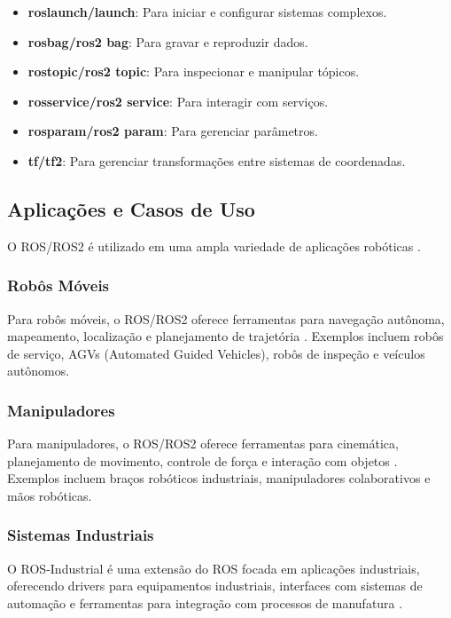 \begin{itemize}
    \item \textbf{roslaunch/launch}: Para iniciar e configurar sistemas complexos.
    \item \textbf{rosbag/ros2 bag}: Para gravar e reproduzir dados.
    \item \textbf{rostopic/ros2 topic}: Para inspecionar e manipular tópicos.
    \item \textbf{rosservice/ros2 service}: Para interagir com serviços.
    \item \textbf{rosparam/ros2 param}: Para gerenciar parâmetros.
    \item \textbf{tf/tf2}: Para gerenciar transformações entre sistemas de coordenadas.
\end{itemize}

\subsection{Aplicações e Casos de Uso}

O ROS/ROS2 é utilizado em uma ampla variedade de aplicações robóticas \cite{Joseph2018, Macenski2022}.

\subsubsection{Robôs Móveis}

Para robôs móveis, o ROS/ROS2 oferece ferramentas para navegação autônoma, mapeamento, localização e planejamento de trajetória \cite{Joseph2018, Macenski2022}. Exemplos incluem robôs de serviço, AGVs (Automated Guided Vehicles), robôs de inspeção e veículos autônomos.

\subsubsection{Manipuladores}

Para manipuladores, o ROS/ROS2 oferece ferramentas para cinemática, planejamento de movimento, controle de força e interação com objetos \cite{Joseph2018, Macenski2022}. Exemplos incluem braços robóticos industriais, manipuladores colaborativos e mãos robóticas.

\subsubsection{Sistemas Industriais}

O ROS-Industrial é uma extensão do ROS focada em aplicações industriais, oferecendo drivers para equipamentos industriais, interfaces com sistemas de automação e ferramentas para integração com processos de manufatura \cite{Joseph2018, Macenski2022}.

